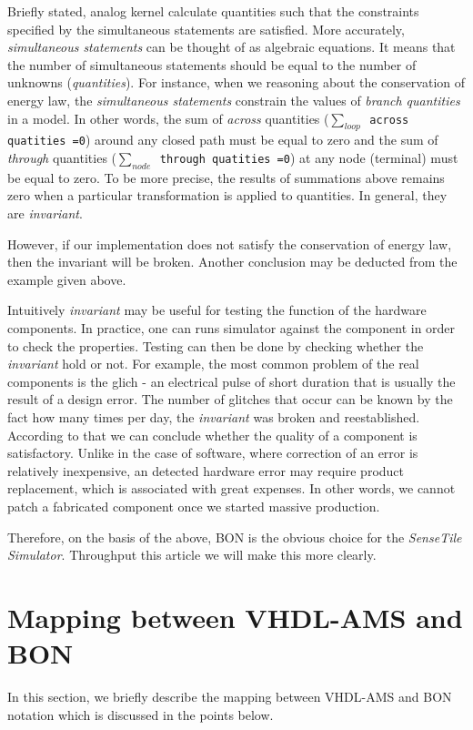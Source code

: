 \documentclass{article}
\newcommand{\STS}{\emph{SenseTile Simulator}\xspace}
\newcommand{\inv}{\emph{invariant}\xspace}
\newcommand{\arcoss}{\emph{across}\xspace}
\newcommand{\through}{\emph{through}\xspace}
\begin{document}
Briefly stated, analog kernel calculate quantities such that the
constraints specified by the simultaneous statements are satisfied.
More accurately, \emph{simultaneous statements} can be thought of as
algebraic equations. It means that the number of simultaneous
statements should be equal to the number of unknowns
(\emph{quantities}).  For instance, when we reasoning about the
conservation of energy law, the \emph{simultaneous statements}
constrain the values of \emph{branch quantities} in a model.  In other
words, the sum of \arcoss quantities (\texttt{$\sum_{loop}$ across
quatities =0}) around any closed path must be equal to zero and the
sum of \through quantities (\texttt{$\sum_{node}$ through quatities
=0}) at any node (terminal) must be equal to zero. To be more precise,
the results of summations above remains zero when a particular
transformation is applied to quantities.  In general, they are \inv.

However, if our implementation does not satisfy the conservation of
energy law, then the invariant will be broken.  Another conclusion may
be deducted from the example given above.

Intuitively \inv may be useful for testing the function of the
hardware components.  In practice, one can runs simulator against the
component in order to check the properties. Testing can then be done
by checking whether the \inv hold or not.  For example, the most
common problem of the real components is the glich - an electrical
pulse of short duration that is usually the result of a design error.
The number of glitches that occur can be known by the fact how many
times per day, the \inv was broken and reestablished. According to
that we can conclude whether the quality of a component is
satisfactory. Unlike in the case of software, where correction of an
error is relatively inexpensive, an detected hardware error may
require product replacement, which is associated with great expenses.
In other words, we cannot patch a fabricated component once we started
massive production.

Therefore, on the basis of the above, BON is the obvious choice for
the \STS.  Throughput this article we will make this more clearly.
\section{Mapping between VHDL-AMS and BON}
\label{sec:mappingVB} In this section, we briefly describe the mapping
between VHDL-AMS and BON notation which is discussed in the points
below.
\end{document}
